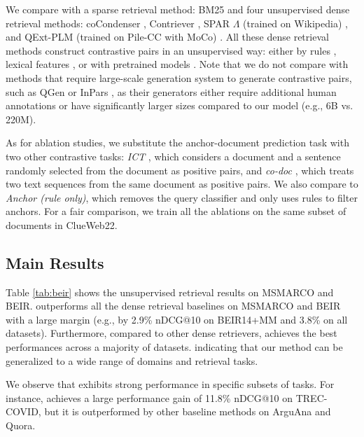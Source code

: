 We compare \anchordrours with a sparse retrieval method: BM25 \cite{BM25} and four unsupervised dense retrieval methods: coCondenser \cite{cocondenser}, Contriever \cite{contriever}, SPAR $\Lambda$ (trained on Wikipedia) \cite{SPAR}, and QExt-PLM (trained on Pile-CC with MoCo) \cite{QExt}. All these dense retrieval methods construct contrastive pairs in an unsupervised way: either by rules \cite{cocondenser,contriever}, lexical features \cite{SPAR}, or with pretrained models \cite{QExt}. 
Note that we do not compare with methods that require large-scale generation system to generate contrastive pairs, such as QGen \cite{QExt} or InPars \cite{InPars}, as their generators either require additional human annotations or have significantly larger sizes compared to our model (e.g., 6B vs. 220M).

As for ablation studies, we substitute the anchor-document prediction task with two other contrastive tasks: 
\textit{ICT} \cite{ICT}, which considers a document and a sentence randomly selected from the document as positive pairs, and 
\textit{co-doc} \cite{cocondenser}, which treats two text sequences from the same document as positive pairs.
We also compare to \textit{Anchor (rule only)}, which removes the query classifier and only uses rules to filter anchors.
For a fair comparison, we train all the ablations on the same subset of documents in ClueWeb22.






\subsection{Main Results}
\label{sec:main}
Table \ref{tab:beir} shows the unsupervised retrieval results on MSMARCO and BEIR. \anchordrours outperforms all the dense retrieval baselines on MSMARCO and BEIR with a large margin (e.g., by 2.9\% nDCG@10 on BEIR14+MM and 3.8\% on all datasets).
Furthermore, compared to other dense retrievers, \anchordrours achieves the best performances across a majority of datasets.
indicating that our method can be generalized to a wide range of domains and retrieval tasks.

We observe that \anchordrours exhibits strong performance in specific subsets of tasks. For instance, \anchordrours achieves a large performance gain of 11.8\% nDCG@10 on TREC-COVID, but it is outperformed by other baseline methods on ArguAna and Quora.


